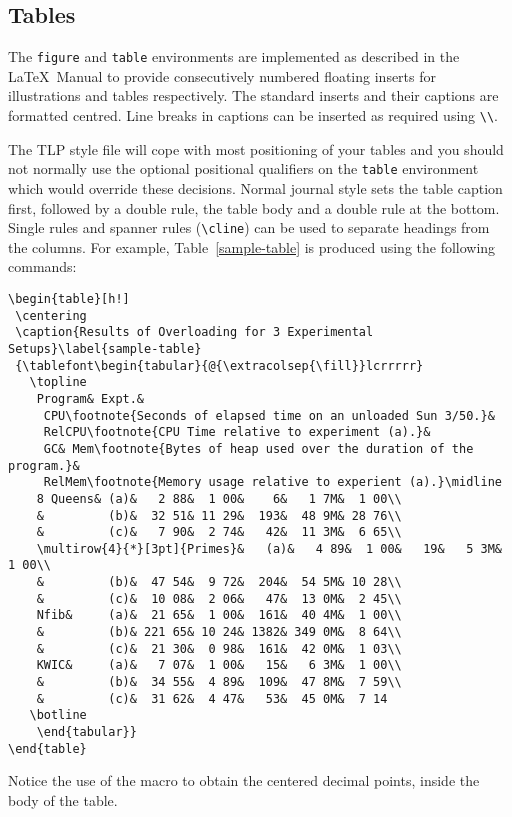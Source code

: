 \documentclass{tlp}
\begin{document}
\subsection{Tables}

The {\tt figure} and {\tt table} environments are implemented as described in
the \LaTeX\ Manual to
provide consecutively numbered floating inserts for illustrations and tables
respectively.
The standard inserts and their captions are formatted centred.
Line breaks in captions can be inserted as required using \verb"\\".

The TLP style file will cope with most positioning of your tables
and you should not normally use the optional positional qualifiers on the
\verb"table" environment which would override these decisions.
Normal journal style sets the table caption first, followed by a double
rule, the table body and a double rule at the bottom.  Single rules and
spanner rules (\verb"\cline") can be used to separate headings from the
columns.  For example, Table~\ref{sample-table} is produced using the
following commands:\par
%
{\fontsize{7}{9}\selectfont
\begin{verbatim}
\begin{table}[h!]
 \centering
 \caption{Results of Overloading for 3 Experimental Setups}\label{sample-table}
 {\tablefont\begin{tabular}{@{\extracolsep{\fill}}lcrrrrr}
   \topline
    Program& Expt.&
     CPU\footnote{Seconds of elapsed time on an unloaded Sun 3/50.}&
     RelCPU\footnote{CPU Time relative to experiment (a).}&
     GC& Mem\footnote{Bytes of heap used over the duration of the program.}&
     RelMem\footnote{Memory usage relative to experient (a).}\midline
    8 Queens& (a)&   2 88&  1 00&    6&   1 7M&  1 00\\
    &         (b)&  32 51& 11 29&  193&  48 9M& 28 76\\
    &         (c)&   7 90&  2 74&   42&  11 3M&  6 65\\
    \multirow{4}{*}[3pt]{Primes}&   (a)&   4 89&  1 00&   19&   5 3M&  1 00\\
    &         (b)&  47 54&  9 72&  204&  54 5M& 10 28\\
    &         (c)&  10 08&  2 06&   47&  13 0M&  2 45\\
    Nfib&     (a)&  21 65&  1 00&  161&  40 4M&  1 00\\
    &         (b)& 221 65& 10 24& 1382& 349 0M&  8 64\\
    &         (c)&  21 30&  0 98&  161&  42 0M&  1 03\\
    KWIC&     (a)&   7 07&  1 00&   15&   6 3M&  1 00\\
    &         (b)&  34 55&  4 89&  109&  47 8M&  7 59\\
    &         (c)&  31 62&  4 47&   53&  45 0M&  7 14
   \botline
    \end{tabular}}
\end{table}
\end{verbatim}}
%
\noindent Notice the use of the \verb"" macro to obtain the centered
decimal points, inside the body of the table.
\end{document}

